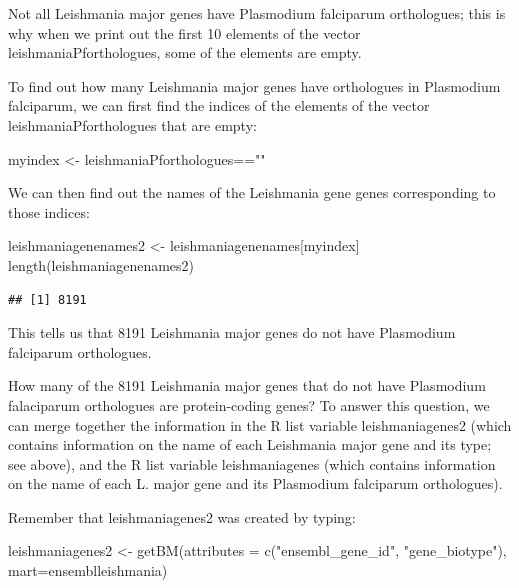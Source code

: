 \documentclass[
]{book}
\newenvironment{Shaded}{\begin{snugshade}}{\end{snugshade}}
\newcommand{\AttributeTok}[1]{\textcolor[rgb]{0.77,0.63,0.00}{#1}}
\newcommand{\FunctionTok}[1]{\textcolor[rgb]{0.00,0.00,0.00}{#1}}
\newcommand{\NormalTok}[1]{#1}
\newcommand{\OtherTok}[1]{\textcolor[rgb]{0.56,0.35,0.01}{#1}}
\newcommand{\SpecialCharTok}[1]{\textcolor[rgb]{0.00,0.00,0.00}{#1}}
\newcommand{\StringTok}[1]{\textcolor[rgb]{0.31,0.60,0.02}{#1}}
\begin{document}
Not all Leishmania major genes have Plasmodium falciparum orthologues; this is why when we print out the first 10 elements of the vector leishmaniaPforthologues, some of the elements are empty.

To find out how many Leishmania major genes have orthologues in Plasmodium falciparum, we can first find the indices of the elements of the vector leishmaniaPforthologues that are empty:

\begin{Shaded}
\begin{Highlighting}[]
\NormalTok{myindex }\OtherTok{\textless{}{-}}\NormalTok{ leishmaniaPforthologues}\SpecialCharTok{==}\StringTok{""}
\end{Highlighting}
\end{Shaded}

We can then find out the names of the Leishmania gene genes corresponding to those indices:

\begin{Shaded}
\begin{Highlighting}[]
\NormalTok{leishmaniagenenames2 }\OtherTok{\textless{}{-}}\NormalTok{ leishmaniagenenames[myindex]}
\FunctionTok{length}\NormalTok{(leishmaniagenenames2)}
\end{Highlighting}
\end{Shaded}

\begin{verbatim}
## [1] 8191
\end{verbatim}

This tells us that 8191 Leishmania major genes do not have Plasmodium falciparum orthologues.

How many of the 8191 Leishmania major genes that do not have Plasmodium falaciparum orthologues are protein-coding genes? To answer this question, we can merge together the information in the R list variable leishmaniagenes2 (which contains information on the name of each Leishmania major gene and its type; see above), and the R list variable leishmaniagenes (which contains information on the name of each L. major gene and its Plasmodium falciparum orthologues).

Remember that leishmaniagenes2 was created by typing:

\begin{Shaded}
\begin{Highlighting}[]
\NormalTok{leishmaniagenes2 }\OtherTok{\textless{}{-}} \FunctionTok{getBM}\NormalTok{(}\AttributeTok{attributes =} \FunctionTok{c}\NormalTok{(}\StringTok{"ensembl\_gene\_id"}\NormalTok{, }\StringTok{"gene\_biotype"}\NormalTok{), }\AttributeTok{mart=}\NormalTok{ensemblleishmania)}
\end{Highlighting}
\end{Shaded}
\end{document}
